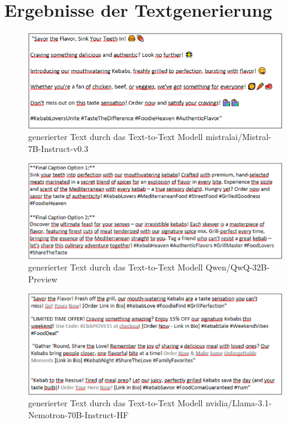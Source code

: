 \section{Ergebnisse der Textgenerierung}\label{sec:bilder-textergebnisse}

\begin{figure}[htbp]
    \centering
    \includegraphics[width=\textwidth]{abbildungen/textresult_mistral}
    \caption{generierter Text durch das Text-to-Text Modell mistralai/Mistral-7B-Instruct-v0.3}
    \label{fig:textresult_mistral}
\end{figure}

\begin{figure}[htbp]
    \centering
    \includegraphics[width=\textwidth]{abbildungen/textresult_Qwen}
    \caption{generierter Text durch das Text-to-Text Modell Qwen/QwQ-32B-Preview}
    \label{fig:textresult_Qwen}
\end{figure}

\begin{figure}[htbp]
    \centering
    \includegraphics[width=\textwidth]{abbildungen/textresult_nvdia_nemotron}
    \caption{generierter Text durch das Text-to-Text Modell nvidia/Llama-3.1-Nemotron-70B-Instruct-HF}
    \label{fig:textresult_nvdia_nemotron}
\end{figure}
